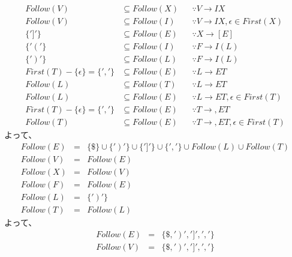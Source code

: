 \documentclass[a4paper,12pt]{jarticle}
\begin{document}
\begin{enumerate}
\begin{align*}
Follow \left( V \right) & \subseteq Follow \left( X \right) & & \because V \rightarrow I X \\
Follow \left( V \right) & \subseteq Follow \left( I \right) & & \because V \rightarrow I X , \epsilon \in First \left( X \right) \\
\{ ' ] ' \} & \subseteq Follow \left( E \right) & & \because X \rightarrow [ E ] \\
\{ ' \left( \right. ' \} & \subseteq Follow \left( I \right) & & \because F \rightarrow I \left( L \right) \\
\{ ' \left. \right) ' \} & \subseteq Follow \left( L \right) & & \because F \rightarrow I \left( L \right) \\
First \left( T \right) - \{ \epsilon \} = \{ ' , ' \} & \subseteq Follow \left( E \right) & & \because L \rightarrow E T \\
Follow \left( L \right) & \subseteq Follow \left( T \right) & & \because L \rightarrow E T \\
Follow \left( L \right) & \subseteq Follow \left( E \right) & & \because L \rightarrow E T , \epsilon \in First \left( T \right) \\
First \left( T \right) - \{ \epsilon \} = \{ ' , ' \} & \subseteq Follow \left( E \right) & & \because T \rightarrow , E T \\
Follow \left( T \right) & \subseteq Follow \left( E \right) & & \because T \rightarrow , E T , \epsilon \in First \left( T \right)
\end{align*}
よって、
\begin{eqnarray*}
Follow \left( E \right) & = & \{ \$ \} \cup \{ ' \left. \right) ' \} \cup \{ ' ] ' \} \cup \{ ' , ' \} \cup Follow \left( L \right) \cup Follow \left( T \right) \\
Follow \left( V \right) & = & Follow \left( E \right) \\
Follow \left( X \right) & = & Follow \left( V \right) \\
Follow \left( F \right) & = & Follow \left( E \right) \\
Follow \left( L \right) & = & \{ ' \left. \right) ' \} \\
Follow \left( T \right) & = & Follow \left( L \right) \
\end{eqnarray*}
よって、
\begin{eqnarray*}
Follow \left( E \right) & = & \{ \$ , ' \left. \right) ' , ' ] ' , ' , ' \} \\
Follow \left( V \right) & = & \{ \$ , ' \left. \right) ' , ' ] ' , ' , ' \} \\

\end{eqnarray*}
\end{enumerate}
\end{document}
